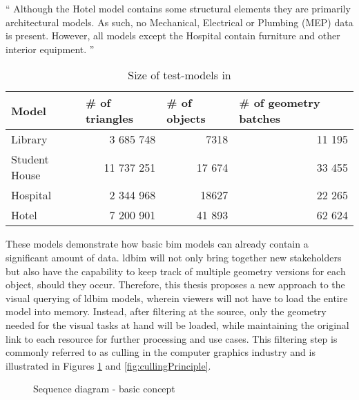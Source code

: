 \enquote{
	Although the Hotel model contains some structural elements they are primarily architectural models. As such, no Mechanical, Electrical or Plumbing (MEP) data is present. However, all models except the Hospital contain furniture and other interior equipment.
} \parencite{Johansson2015}

\begin{table}[h]
	\centering
	\begin{tabular}{@{}lrrr@{}}
		\toprule
		Model         & \multicolumn{1}{l}{\# of  triangles} & \multicolumn{1}{l}{\# of objects} & \multicolumn{1}{l}{\# of geometry batches} \\ \midrule
		Library       & 3 685 748                            & 7318                              & 11 195                                     \\
		Student House & 11 737 251                           & 17 674                            & 33 455                                     \\
		Hospital      & 2 344 968                            & 18627                             & 22 265                                     \\
		Hotel         & 7 200 901                            & 41 893                            & 62 624                                     \\ \bottomrule
	\end{tabular}
	\caption{Size of test-models in \cite{Johansson2015}}
	\label{tab:sizeModels}
\end{table}

These models demonstrate how basic \ac{bim} models can already contain a significant amount of data. \ac{ldbim} will not only bring together new stakeholders but also have the capability to keep track of multiple geometry versions for each object, should they occur. Therefore, this thesis proposes a new approach to the visual querying of \ac{ldbim} models, wherein viewers will not have to load the entire model into memory. Instead, after filtering at the source, only the geometry needed for the visual tasks at hand will be loaded, while maintaining the original link to each resource for further processing and use cases. This filtering step is commonly referred to as culling in the computer graphics industry and is illustrated in Figures \ref{fig:firstIdea} and \ref{fig:cullingPrinciple}.

\begin{figure}[h]
	\centering
	
	\caption{Sequence diagram - basic concept}
	\label{fig:firstIdea}
\end{figure}

